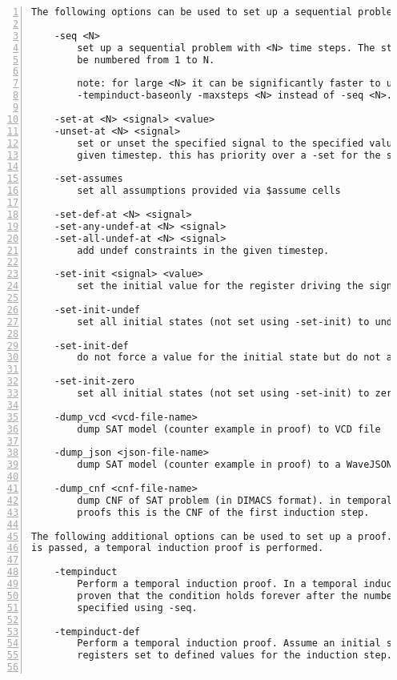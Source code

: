 \begin{lstlisting}[numbers=left,frame=single]
The following options can be used to set up a sequential problem:

    -seq <N>
        set up a sequential problem with <N> time steps. The steps will
        be numbered from 1 to N.

        note: for large <N> it can be significantly faster to use
        -tempinduct-baseonly -maxsteps <N> instead of -seq <N>.

    -set-at <N> <signal> <value>
    -unset-at <N> <signal>
        set or unset the specified signal to the specified value in the
        given timestep. this has priority over a -set for the same signal.

    -set-assumes
        set all assumptions provided via $assume cells

    -set-def-at <N> <signal>
    -set-any-undef-at <N> <signal>
    -set-all-undef-at <N> <signal>
        add undef constraints in the given timestep.

    -set-init <signal> <value>
        set the initial value for the register driving the signal to the value

    -set-init-undef
        set all initial states (not set using -set-init) to undef

    -set-init-def
        do not force a value for the initial state but do not allow undef

    -set-init-zero
        set all initial states (not set using -set-init) to zero

    -dump_vcd <vcd-file-name>
        dump SAT model (counter example in proof) to VCD file

    -dump_json <json-file-name>
        dump SAT model (counter example in proof) to a WaveJSON file.

    -dump_cnf <cnf-file-name>
        dump CNF of SAT problem (in DIMACS format). in temporal induction
        proofs this is the CNF of the first induction step.

The following additional options can be used to set up a proof. If also -seq
is passed, a temporal induction proof is performed.

    -tempinduct
        Perform a temporal induction proof. In a temporal induction proof it is
        proven that the condition holds forever after the number of time steps
        specified using -seq.

    -tempinduct-def
        Perform a temporal induction proof. Assume an initial state with all
        registers set to defined values for the induction step.


\end{lstlisting}
